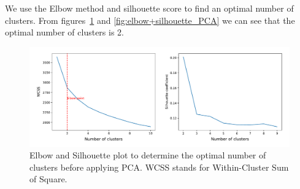 \documentclass[a4paper,fleqn]{cas-sc}
\begin{document}





We use the Elbow method and silhouette score to find an optimal number of clusters. From figures~\ref{fig:elbow+silhouette} and \ref{fig:elbow+silhouette_PCA} we can see that the optimal number of clusters is 2.

\begin{figure}[htb]
  \centering
  \includegraphics[width = \textwidth]{figs/elbow+silhouette_plot.pdf}
  \caption{Elbow and Silhouette plot to determine the optimal number of clusters before applying PCA. WCSS stands for Within-Cluster Sum of Square.}
  \label{fig:elbow+silhouette}
\end{figure}
\end{document}

